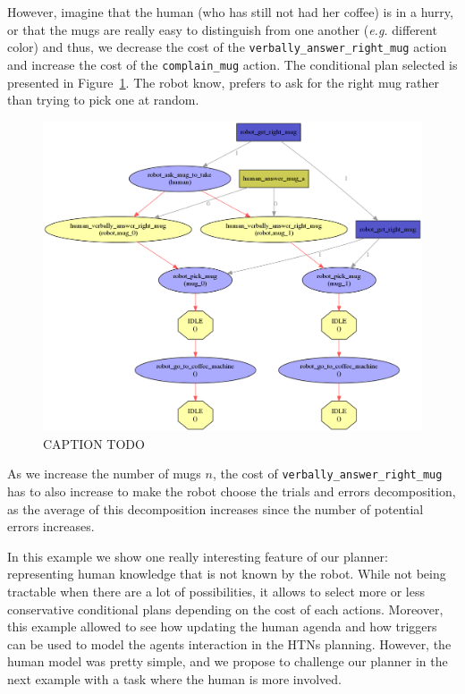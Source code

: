 \documentclass[a4paper,11pt,twoside]{StyleThese}
\begin{document}
However, imagine that the human (who has still not had her coffee) is in a hurry, or that the mugs are really easy to distinguish from one another (\textit{e.g.} different color) and thus, we decrease the cost of the \verb'verbally_answer_right_mug' action and increase the cost of the \verb'complain_mug' action. The conditional plan selected is presented in Figure~\ref{fig:chap4mugask}. The robot know, prefers to ask for the right mug rather than trying to pick one at random.
\begin{figure}[hbtp]
\centering
\includegraphics[width=\textwidth]{figures/chapter4/mug_selection_ask.png}
\caption{CAPTION TODO}
\label{fig:chap4mugask}
\end{figure}

As we increase the number of mugs $n$, the cost of \verb'verbally_answer_right_mug' has to also increase to make the robot choose the trials and errors decomposition, as the average of this decomposition increases since the number of potential errors increases. 

In this example we show one really interesting feature of our planner: representing human knowledge that is not known by the robot. While not being tractable when there are a lot of possibilities, it allows to select more or less conservative conditional plans depending on the cost of each actions. Moreover, this example allowed to see how updating the human agenda and how triggers can be used to model the agents interaction in the HTNs planning.
However, the human model was pretty simple, and we propose to challenge our planner in the next example with a task where the human is more involved.
\end{document}
